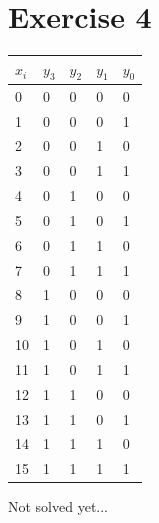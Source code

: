 \documentclass[10pt,a4paper]{scrartcl}
\begin{document}
\section{Exercise 4}

\begin{tabular}{|l||l|l|l|l|}\hline
$x_i$ & $y_3$ & $y_2$ & $y_1$ & $y_0$ \\\hline\hline
0 & 0 & 0 & 0 & 0  \\\hline
1 & 0 & 0 & 0 & 1  \\\hline
2 & 0 & 0 & 1 & 0  \\\hline
3 & 0 & 0 & 1 & 1  \\\hline
4 & 0 & 1 & 0 & 0  \\\hline
5 & 0 & 1 & 0 & 1  \\\hline
6 & 0 & 1 & 1 & 0  \\\hline
7 & 0 & 1 & 1 & 1  \\\hline
8 & 1 & 0 & 0 & 0  \\\hline
9 & 1 & 0 & 0 & 1  \\\hline
10 & 1 & 0 & 1 & 0 \\\hline
11 & 1 & 0 & 1 & 1 \\\hline
12 & 1 & 1 & 0 & 0 \\\hline
13 & 1 & 1 & 0 & 1 \\\hline
14 & 1 & 1 & 1 & 0 \\\hline
15 & 1 & 1 & 1 & 1 \\\hline
\end{tabular}
Not solved yet...
\end{document}
